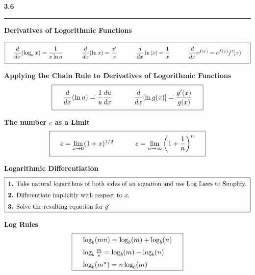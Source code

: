 \documentclass{article}
\begin{document}
\begin{center}
\Large\textbf{3.6}

\noindent\hfill\rule{0.3\textwidth}{.4pt}\hfill
\vspace{16pt}

\large\textbf{Derivatives of Logorithmic Functions}
\begin{large}
\[\arraycolsep=16pt\def\arraystretch{2.5}
\begin{array}{| l l l l|}
	\hline
	\dfrac{d}{dx} (\log_a x) = \dfrac{1}{x \ln a} & \dfrac{d}{dx} (\ln x) = \dfrac{x'}{x} & \dfrac{d}{dx} \ln |x| = \dfrac{1}{x} & \dfrac{d}{dx} e^{f(x)} = e^{f(x)} f'(x) \\
	[\medskipamount]	
	\hline
\end{array}
\]
\vspace{16pt}

\large\textbf{Applying the Chain Rule to Derivatives of Logorithmic Functions}
\[\arraycolsep=16pt\def\arraystretch{2.5}
\begin{array}{| l l |}
	\hline
	\dfrac{d}{dx} (\ln u) = \dfrac{1}{u} \dfrac{du}{dx} & \dfrac{d}{dx} [\ln g(x)] = \dfrac{g'(x)}{g(x)} \\
	[\medskipamount]	
	\hline
\end{array}
\]
\vspace{16pt}

\large\textbf{The number $e$ as a Limit}
\[\arraycolsep=16pt\def\arraystretch{2.5}
\begin{array}{| l l |}
	\hline
	e = \underset{x \to 0}{\lim} (1+x)^{1/2} & e = \underset{n \to \infty}{\lim} \left(1+\dfrac{1}{n}\right)^n \\
	[\medskipamount]	
	\hline
\end{array}
\]
\vspace{16pt}

\large\textbf{Logarithmic Differentiation}
\[\arraycolsep=16pt\def\arraystretch{1.5}
\begin{tabular}{| l |}
	\hline
	\textbf{1.} Take natural logarithms of both sides of an equation and use Log Laws to Simplify. \\
	\textbf{2.} Differentiate implicitly with respect to $x$. \\
	\textbf{3.} Solve the resulting equation for $y'$ \\
	\hline
\end{tabular}
\]
\vspace{16pt}

\large\textbf{Log Rules}
\[\arraycolsep=16pt\def\arraystretch{1.5}
\begin{array}{| l |}
	\hline
	\log_b (mn) = \log_b(m) + \log_b(n) \\
	\log_b \frac{m}{n} = \log_b(m) - \log_b(n) \\
	\log_b (m^n) = n \log_b(m) \\	
	\hline
\end{array}
\]
\vspace{16pt}
\end{large}
\end{center}
\pagebreak
\end{document}
